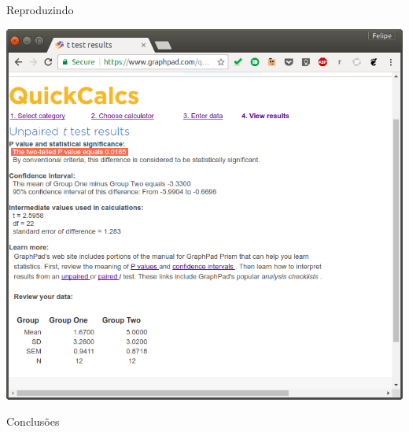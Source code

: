 \documentclass{beamer}
\begin{document}
\begin{frame}{Reproduzindo}
  \begin{center}
    \includegraphics[height=.9\textheight]{figuras/teste-t3}
  \end{center}  
\end{frame}

\begin{frame}{Conclusões}
  
\end{frame}
\end{document}
